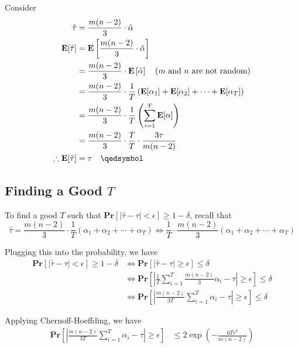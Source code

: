 Consider
\begin{equation*}
\begin{aligned}
  \hat{\tau}
    &= \frac{m(n-2)}{3}\cdot\hat{\alpha} \\
  \mathbf{E}[\hat{\tau}]
    &= \mathbf{E}\left[\frac{m(n-2)}{3}\cdot\hat{\alpha}\right] \\
    &= \frac{m(n-2)}{3}\cdot\mathbf{E}\left[\hat{\alpha}\right] \quad \text{($m$ and $n$ are not random)} \\
    &= \frac{m(n-2)}{3}\cdot\frac{1}{T}\left(\mathbf{E}[\alpha_1] + \mathbf{E}[\alpha_2] + \cdots + \mathbf{E}[\alpha_T]\right) \\
    &= \frac{m(n-2)}{3}\cdot\frac{1}{T}\left(\sum_{i=1}^T \mathbf{E}[\alpha]\right) \\
    &= \frac{m(n-2)}{3}\cdot\frac{T}{T}\cdot \frac{3\tau}{m(n-2)} \\
  \therefore \mathbf{E}[\hat{\tau}]
    &= \tau \quad \qedsymbol
\end{aligned}
\end{equation*}

\subsection{Finding a Good $T$}

To find a good $T$ such that $\mathbf{Pr}[|\hat{\tau} - \tau| < \epsilon] \geq 1 - \delta$, recall that 
\[
  \hat{\tau}
    = \frac{m(n-2)}{3}\cdot\frac{1}{T}(\alpha_1 + \alpha_2 + \cdots + \alpha_T)
    \iff \frac{1}{T}\cdot\frac{m(n-2)}{3}(\alpha_1 + \alpha_2 + \cdots + \alpha_T)
\]

Plugging this into the probability, we have
\[
\begin{aligned}
  \mathbf{Pr}[|\hat{\tau} - \tau| < \epsilon] \geq 1 - \delta
    &\iff \mathbf{Pr}[|\hat{\tau} - \tau| \geq \epsilon] \leq \delta \\
    &\iff \mathbf{Pr}\left[\left|\frac{1}{T}\sum_{i=1}^T\frac{m(n-2)}{3}\alpha_i - \tau\right| \geq \epsilon\right] \leq \delta \\
    &\iff \mathbf{Pr}\left[\left|\frac{m(n-2)}{3T}\sum_{i=1}^T\alpha_i - \tau\right| \geq \epsilon\right] \leq \delta
\end{aligned}
\]

Applying Chernoff-Hoeffding, we have
\[
\begin{aligned}
  \mathbf{Pr}\left[\left|\frac{m(n-2)}{3T}\sum_{i=1}^T\alpha_i - \tau\right| \geq \epsilon\right] &\leq 2\exp\left(-\frac{6T\epsilon^2}{m(n-2)}\right)
\end{aligned}  
\]

